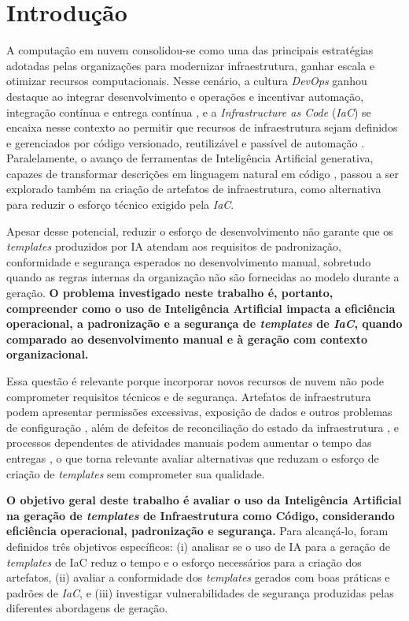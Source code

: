\section{Introdução}
\label{sec:introducao}

A computação em nuvem consolidou-se como uma das principais estratégias adotadas pelas organizações para modernizar infraestrutura, ganhar escala e otimizar recursos computacionais. Nesse cenário, a cultura \textit{DevOps} ganhou destaque ao integrar desenvolvimento e operações e incentivar automação, integração contínua e entrega contínua \cite{kim2016devops}, e a \textit{Infrastructure as Code} (\textit{IaC}) se encaixa nesse contexto ao permitir que recursos de infraestrutura sejam definidos e gerenciados por código versionado, reutilizável e passível de automação \cite{morris2016infrastructure}. Paralelamente, o avanço de ferramentas de Inteligência Artificial generativa, capazes de transformar descrições em linguagem natural em código \cite{chen2021codex}, passou a ser explorado também na criação de artefatos de infraestrutura, como alternativa para reduzir o esforço técnico exigido pela \textit{IaC}.

Apesar desse potencial, reduzir o esforço de desenvolvimento não garante que os \textit{templates} produzidos por IA atendam aos requisitos de padronização, conformidade e segurança esperados no desenvolvimento manual, sobretudo quando as regras internas da organização não são fornecidas ao modelo durante a geração. \textbf{O problema investigado neste trabalho é, portanto, compreender como o uso de Inteligência Artificial impacta a eficiência operacional, a padronização e a segurança de \textit{templates} de \textit{IaC}, quando comparado ao desenvolvimento manual e à geração com contexto organizacional.}

Essa questão é relevante porque incorporar novos recursos de nuvem não pode comprometer requisitos técnicos e de segurança. Artefatos de infraestrutura podem apresentar permissões excessivas, exposição de dados e outros problemas de configuração \cite{rahman2021securitysmells,verdet2025security}, além de defeitos de reconciliação do estado da infraestrutura \cite{hassan2024state}, e processos dependentes de atividades manuais podem aumentar o tempo das entregas \cite{forsgren2018accelerate}, o que torna relevante avaliar alternativas que reduzam o esforço de criação de \textit{templates} sem comprometer sua qualidade.

\textbf{O objetivo geral deste trabalho é avaliar o uso da Inteligência Artificial na geração de \textit{templates} de Infraestrutura como Código, considerando eficiência operacional, padronização e segurança.} Para alcançá-lo, foram definidos três objetivos específicos: (i) analisar se o uso de IA para a geração de \textit{templates} de IaC reduz o tempo e o esforço necessários para a criação dos artefatos, (ii) avaliar a conformidade dos \textit{templates} gerados com boas práticas e padrões de \textit{IaC}, e (iii) investigar vulnerabilidades de segurança produzidas pelas diferentes abordagens de geração.

